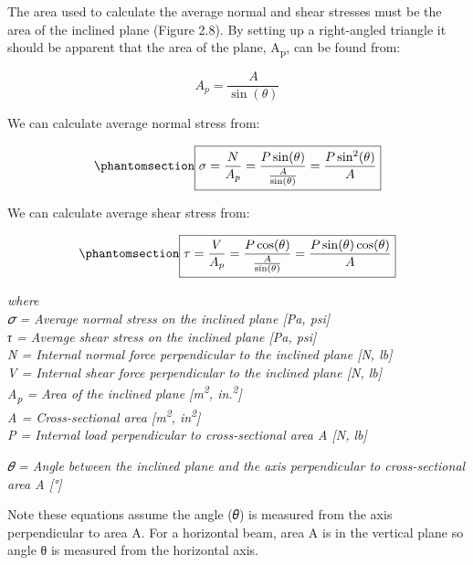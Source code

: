 \documentclass[
  letterpaper,
  DIV=11,
  numbers=noendperiod]{scrreprt}
\theoremstyle{definition}
\theoremstyle{remark}
\begin{document}
The area used to calculate the average normal and shear stresses must be
the area of the inclined plane (Figure 2.8). By setting up a
right-angled triangle it should be apparent that the area of the plane,
A\textsubscript{p}, can be found from:

\[
A_p=\frac{A}{\sin (\theta)}
\]

We can calculate average normal stress from:

\begin{equation}\phantomsection\label{eq-2.3}{\boxed{\sigma=\frac{N}{A_p}=\frac{P \sin (\theta)}{\frac{A}{\sin (\theta)}}=\frac{P \sin ^2(\theta)}{A}}}\end{equation}

We can calculate average shear stress from:

\begin{equation}\phantomsection\label{eq-2.4}{\boxed{\tau=\frac{V}{A_p}=\frac{P \cos (\theta)}{\frac{A}{\sin (\theta)}}=\frac{P \sin (\theta) \cos (\theta)}{A}}}\end{equation}

\emph{where}\\
\emph{𝜎 = Average normal stress on the inclined plane {[}Pa, psi{]}}\\
\emph{τ = Average shear stress on the inclined plane {[}Pa, psi{]}}\\
\emph{N = Internal normal force perpendicular to the inclined plane
{[}N, lb{]}}\\
\emph{V = Internal shear force perpendicular to the inclined plane {[}N,
lb{]}}\\
\emph{A\textsubscript{p} = Area of the inclined plane
{[}m\textsuperscript{2}, in.\textsuperscript{2}{]}}\\
\emph{A = Cross-sectional area {[}m\textsuperscript{2},
in\textsuperscript{2}{]}}\\
\emph{P = Internal load perpendicular to cross-sectional area A {[}N,
lb{]}}

\emph{𝜃 = Angle between the inclined plane and the axis perpendicular to
cross-sectional area A {[}°{]}}

Note these equations assume the angle (𝜃) is measured from the axis
perpendicular to area A. For a horizontal beam, area A is in the
vertical plane so angle θ is measured from the horizontal axis.
\end{document}
